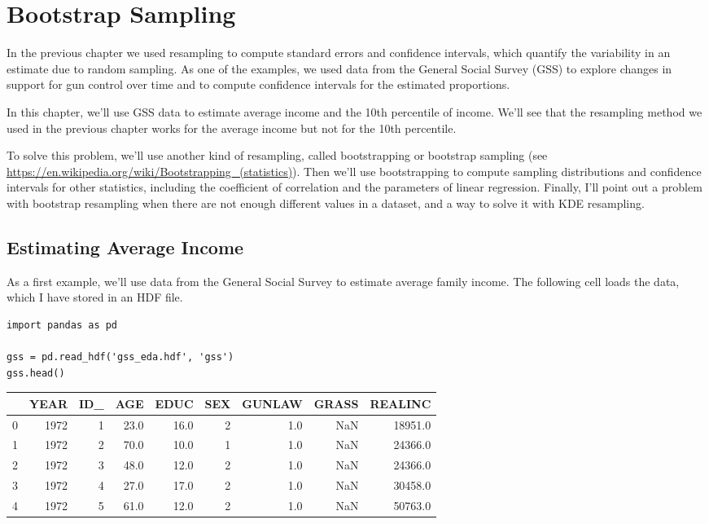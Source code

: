 \hypertarget{bootstrap-sampling}{%
\chapter{Bootstrap Sampling}\label{bootstrap-sampling}}

In the previous chapter we used resampling to compute standard errors
and confidence intervals, which quantify the variability in an estimate
due to random sampling. As one of the examples, we used data from the
General Social Survey (GSS) to explore changes in support for gun
control over time and to compute confidence intervals for the estimated
proportions.

In this chapter, we'll use GSS data to estimate average income and the
10th percentile of income. We'll see that the resampling method we used
in the previous chapter works for the average income but not for the
10th percentile.

To solve this problem, we'll use another kind of resampling, called
bootstrapping or bootstrap sampling (see
\url{https://en.wikipedia.org/wiki/Bootstrapping_(statistics)}). Then
we'll use bootstrapping to compute sampling distributions and confidence
intervals for other statistics, including the coefficient of correlation
and the parameters of linear regression. Finally, I'll point out a
problem with bootstrap resampling when there are not enough different
values in a dataset, and a way to solve it with KDE resampling.

\hypertarget{estimating-average-income}{%
\section{Estimating Average Income}\label{estimating-average-income}}

As a first example, we'll use data from the General Social Survey to
estimate average family income. The following cell loads the data, which
I have stored in an HDF file.

\begin{lstlisting}[]
import pandas as pd

gss = pd.read_hdf('gss_eda.hdf', 'gss')
gss.head()
\end{lstlisting}

\begin{tabular}{lrrrrrrrr}
\midrule
{} &  YEAR &  ID\_ &   AGE &  EDUC &  SEX &  GUNLAW &  GRASS &  REALINC \\
\midrule
0 &  1972 &    1 &  23.0 &  16.0 &    2 &     1.0 &    NaN &  18951.0 \\
1 &  1972 &    2 &  70.0 &  10.0 &    1 &     1.0 &    NaN &  24366.0 \\
2 &  1972 &    3 &  48.0 &  12.0 &    2 &     1.0 &    NaN &  24366.0 \\
3 &  1972 &    4 &  27.0 &  17.0 &    2 &     1.0 &    NaN &  30458.0 \\
4 &  1972 &    5 &  61.0 &  12.0 &    2 &     1.0 &    NaN &  50763.0 \\
\midrule
\end{tabular}

